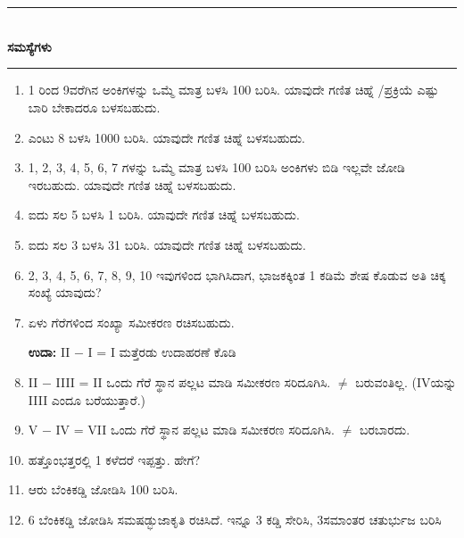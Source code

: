 \chapter[ಅಧ್ಯಾಯ 3]{}\label{chap3}

\begin{center}
\rule{5cm}{1pt}\\[5pt]
{\Large\bfseries ಸಮಸ್ಯೆಗಳು}\\[3pt]
\rule{5cm}{1pt}
\end{center}

\smallskip
\begin{enumerate}
\renewcommand{\labelenumi}{\bf\theenumi.}
\itemsep=5pt
\item 1 ರಿಂದ 9ವರೆಗಿನ ಅಂಕಿಗಳನ್ನು ಒಮ್ಮೆ ಮಾತ್ರ ಬಳಸಿ 100 ಬರಿಸಿ. ಯಾವುದೇ ಗಣಿತ ಚಿಹ್ನೆ /ಪ್ರಕ್ರಿಯೆ ಎಷ್ಟು ಬಾರಿ ಬೇಕಾದರೂ ಬಳಸಬಹುದು.

\item ಎಂಟು 8 ಬಳಸಿ 1000 ಬರಿಸಿ. ಯಾವುದೇ ಗಣಿತ ಚಿಹ್ನೆ ಬಳಸಬಹುದು.

\item 1, 2, 3, 4, 5, 6, 7 ಗಳನ್ನು ಒಮ್ಮೆ ಮಾತ್ರ ಬಳಸಿ 100 ಬರಿಸಿ ಅಂಕಿಗಳು ಬಿಡಿ ಇಲ್ಲವೇ ಜೋಡಿ ಇರಬಹುದು. ಯಾವುದೇ ಗಣಿತ ಚಿಹ್ನೆ ಬಳಸಬಹುದು.

\item ಐದು ಸಲ 5 ಬಳಸಿ 1  ಬರಿಸಿ. ಯಾವುದೇ ಗಣಿತ ಚಿಹ್ನೆ ಬಳಸಬಹುದು.

\item ಐದು ಸಲ 3 ಬಳಸಿ 31 ಬರಿಸಿ. ಯಾವುದೇ ಗಣಿತ ಚಿಹ್ನೆ  ಬಳಸಬಹುದು. 

\item 2, 3, 4, 5, 6, 7, 8, 9, 10 ಇವುಗಳಿಂದ ಭಾಗಿಸಿದಾಗ, ಭಾಜಕಕ್ಕಿಂತ 1 ಕಡಿಮೆ ಶೇಷ ಕೊಡುವ ಅತಿ ಚಿಕ್ಕ ಸಂಖ್ಯೆ ಯಾವುದು? 

\item ಏಳು ಗೆರೆಗಳಿಂದ ಸಂಖ್ಯಾ ಸಮೀಕರಣ ರಚಿಸಬಹುದು. 

{\bf ಉದಾ:} II $-$ I = I ಮತ್ತೆರಡು ಉದಾಹರಣೆ ಕೊಡಿ

\item II $-$ IIII = II ಒಂದು ಗೆರೆ ಸ್ಥಾನ ಪಲ್ಲಟ ಮಾಡಿ ಸಮೀಕರಣ ಸರಿದೂಗಿಸಿ. $\neq$ ಬರುವಂತಿಲ್ಲ. (IVಯನ್ನು IIII ಎಂದೂ ಬರೆಯುತ್ತಾರೆ.) 

\item V $-$ IV = VII ಒಂದು ಗೆರೆ ಸ್ಥಾನ ಪಲ್ಲಟ ಮಾಡಿ ಸಮೀಕರಣ ಸರಿದೂಗಿಸಿ. $\neq$ ಬರಬಾರದು.

\item ಹತ್ತೊಂಭತ್ತರಲ್ಲಿ 1 ಕಳೆದರೆ ಇಪ್ಪತ್ತು. ಹೇಗೆ?

\item ಆರು ಬೆಂಕಿಕಡ್ಡಿ ಜೋಡಿಸಿ 100 ಬರಿಸಿ.

\item 6 ಬೆಂಕಿಕಡ್ಡಿ ಜೋಡಿಸಿ ಸಮಷಡ್ಭುಜಾಕೃತಿ ರಚಿಸಿದೆ. ಇನ್ನೂ 3 ಕಡ್ಡಿ  ಸೇರಿಸಿ, 3\break ಸಮಾಂತರ ಚತುರ್ಭುಜ ಬರಿಸಿ 


\end{enumerate}
